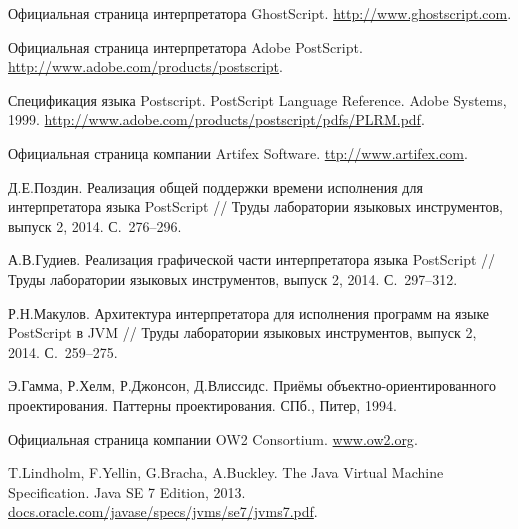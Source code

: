	\begin{thebibliography}{99}
		Официальная страница интерпретатора GhostScript. 
		\url{http://www.ghostscript.com}.
		
		Официальная страница интерпретатора Adobe PostScript. 
		\url{http://www.adobe.com/products/postscript}.
		
		Спецификация языка Postscript. PostScript Language Reference. 
		Adobe Systems, 1999.
		\url{http://www.adobe.com/products/postscript/pdfs/PLRM.pdf}.
		
		Официальная страница компании Artifex Software. 
		\url{ttp://www.artifex.com}.

		Д.Е.Поздин. Реализация общей поддержки времени исполнения для интерпретатора языка PostScript // 
                Труды лаборатории языковых инструментов, выпуск 2, 2014. С.~276--296.
		
		А.В.Гудиев.
		Реализация графической части интерпретатора языка PostScript // 
                Труды лаборатории языковых инструментов, выпуск 2, 2014. С.~297--312.

		Р.Н.Макулов.
		Архитектура интерпретатора для исполнения программ на языке PostScript в JVM // 
                Труды лаборатории языковых инструментов, выпуск 2, 2014. С.~259--275.
				
		Э.Гамма, Р.Хелм, Р.Джонсон, Д.Влиссидс. Приёмы объектно-ориентированного проектирования. 
                Паттерны проектирования. СПб., Питер, 1994.

		Официальная страница компании OW2 Consortium. \url{www.ow2.org}.
				
		T.Lindholm, F.Yellin, G.Bracha, A.Buckley.
		The Java Virtual Machine Specification. Java SE 7 Edition, 2013. 
		\url{docs.oracle.com/javase/specs/jvms/se7/jvms7.pdf}.
	\end{thebibliography}
